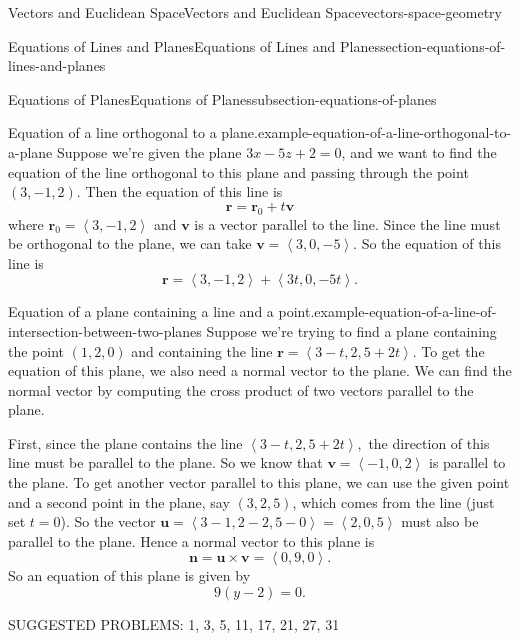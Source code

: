 \documentclass[oneside,10pt,]{book}
\numberwithin{equation}{section}
\newcommand{\vv}[1]{\mathbf{#1}}
\newcommand{\dotprod}[1]{\left\langle #1 \right\rangle}
\begin{document}
\begin{chapterptx}{Vectors and Euclidean Space}{}{Vectors and Euclidean Space}{}{}{vectors-space-geometry}
\begin{sectionptx}{Equations of Lines and Planes}{}{Equations of Lines and Planes}{}{}{section-equations-of-lines-and-planes}
\begin{subsectionptx}{Equations of Planes}{}{Equations of Planes}{}{}{subsection-equations-of-planes}
\begin{example}{Equation of a line orthogonal to a plane.}{example-equation-of-a-line-orthogonal-to-a-plane}
\hypertarget{p-1228}{}%
Suppose we're given the plane \(3x-5z+2 = 0\), and we want to find the equation of the line orthogonal to this plane and passing through the point \((3,-1,2)\). Then the equation of this line is%
%
\begin{equation*}
\vv{r} = \vv{r}_{0}+t\vv{v}
\end{equation*}
\hypertarget{p-1229}{}%
where \(\vv{r}_{0} = \dotprod{3,-1,2}\) and \(\vv{v}\) is a vector parallel to the line. Since the line must be orthogonal to the plane, we can take \(\vv{v} = \dotprod{3,0,-5}\). So the equation of this line is%
%
\begin{equation*}
\vv{r} = \dotprod{3,-1,2}+\dotprod{3t,0,-5t}.
\end{equation*}
\end{example}
\begin{example}{Equation of a plane containing a line and a point.}{example-equation-of-a-line-of-intersection-between-two-planes}%
\hypertarget{p-1230}{}%
Suppose we're trying to find a plane containing the point \((1,2,0)\) and containing the line \(\vv{r} = \dotprod{3-t,2,5+2t}\). To get the equation of this plane, we also need a normal vector to the plane. We can find the normal vector by computing the cross product of two vectors parallel to the plane.%
\par
\hypertarget{p-1231}{}%
First, since the plane contains the line \(\dotprod{3-t,2,5+2t},\) the direction of this line must be parallel to the plane. So we know that \(\vv{v} = \dotprod{-1,0,2}\) is parallel to the plane. To get another vector parallel to this plane, we can use the given point and a second point in the plane, say \((3,2,5)\), which comes from the line (just set \(t=0\)). So the vector \(\vv{u} = \dotprod{3-1,2-2,5-0} = \dotprod{2,0,5}\) must also be parallel to the plane. Hence a normal vector to this plane is%
%
\begin{equation*}
\vv{n} = \vv{u}\times\vv{v} = \dotprod{0,9,0}.
\end{equation*}
\hypertarget{p-1232}{}%
So an equation of this plane is given by%
%
\begin{equation*}
9(y-2) = 0.
\end{equation*}
\end{example}
\hypertarget{p-1233}{}%
SUGGESTED PROBLEMS: 1, 3, 5, 11, 17, 21, 27, 31%
\end{subsectionptx}
\end{sectionptx}
%
%
\typeout{************************************************}

\end{chapterptx}
\end{document}

